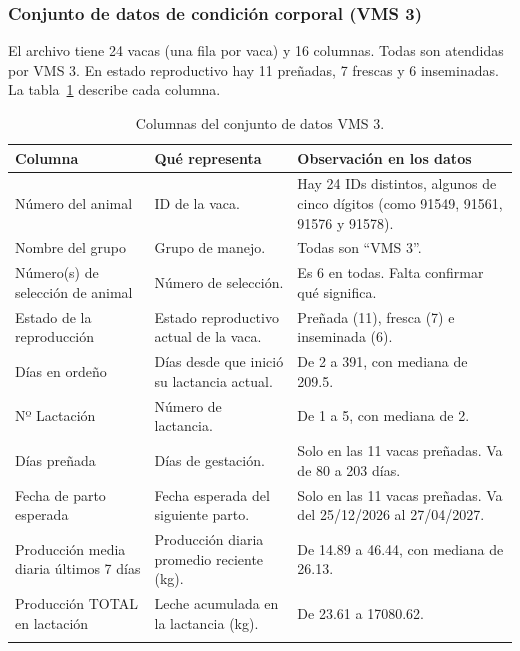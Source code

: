 \subsubsection*{Conjunto de datos de condición corporal (VMS 3)}

El archivo tiene 24 vacas (una fila por vaca) y 16 columnas. Todas son atendidas por VMS 3. En estado reproductivo hay 11 preñadas, 7 frescas y 6 inseminadas. La tabla~\ref{tab:vms3} describe cada columna.

\begin{table}[H]
  \centering
  \small
  \caption{Columnas del conjunto de datos VMS 3.}
  \label{tab:vms3}
  \begin{tabularx}{\textwidth}{>{\raggedright\arraybackslash}p{}>{\raggedright\arraybackslash}X>{\raggedright\arraybackslash}X}
    \toprule
    Columna & Qué representa & Observación en los datos \\
    \midrule
    Número del animal & ID de la vaca. & Hay 24 IDs distintos, algunos de cinco dígitos (como 91549, 91561, 91576 y 91578). \\
    \addlinespace
    Nombre del grupo & Grupo de manejo. & Todas son ``VMS 3''. \\
    \addlinespace
    Número(s) de selección de animal & Número de selección. & Es 6 en todas. Falta confirmar qué significa. \\
    \addlinespace
    Estado de la reproducción & Estado reproductivo actual de la vaca. & Preñada (11), fresca (7) e inseminada (6). \\
    \addlinespace
    Días en ordeño & Días desde que inició su lactancia actual. & De 2 a 391, con mediana de 209.5. \\
    \addlinespace
    Nº Lactación & Número de lactancia. & De 1 a 5, con mediana de 2. \\
    \addlinespace
    Días preñada & Días de gestación. & Solo en las 11 vacas preñadas. Va de 80 a 203 días. \\
    \addlinespace
    Fecha de parto esperada & Fecha esperada del siguiente parto. & Solo en las 11 vacas preñadas. Va del 25/12/2026 al 27/04/2027. \\
    \addlinespace
    Producción media diaria últimos 7 días & Producción diaria promedio reciente (kg). & De 14.89 a 46.44, con mediana de 26.13. \\
    \addlinespace
    Producción TOTAL en lactación & Leche acumulada en la lactancia (kg). & De 23.61 a 17080.62. \\
    \addlinespace

\end{tabularx}
\end{table}
